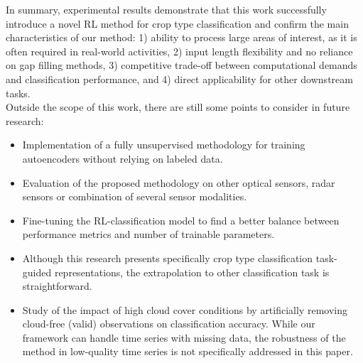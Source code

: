 \documentclass[journal,article,submit,pdftex,moreauthors]{Definitions/mdpi}
\begin{document}
In summary, experimental results demonstrate that this work successfully introduce a novel \ac{RL} method for crop type classification and confirm the main characteristics of our method: 1) ability to process large areas of interest, as it is often required in real-world activities, 2) input length flexibility and no reliance on gap filling methods, 3) competitive trade-off between computational demands and classification performance, and 4) direct applicability for other downstream tasks.\\


Outside the scope of this work, there are still some points to consider in future research:
\begin{itemize}
	\item Implementation of a fully unsupervised methodology for training autoencoders without relying on labeled data.
	\item Evaluation of the proposed methodology on other optical sensors, radar sensors or combination of several sensor modalities.
	\item Fine-tuning the RL-classification model to find a better balance between performance metrics and number of trainable parameters.
    \item Although this research presents specifically crop type classification task-guided representations, the extrapolation to other classification task is straightforward.
    \item Study of the impact of high cloud cover conditions by artificially removing cloud-free (valid) observations on classification accuracy. While our framework can handle time series with missing data, the robustness of the method in low-quality time series is not specifically addressed in this paper.
\end{itemize}
\end{document}
